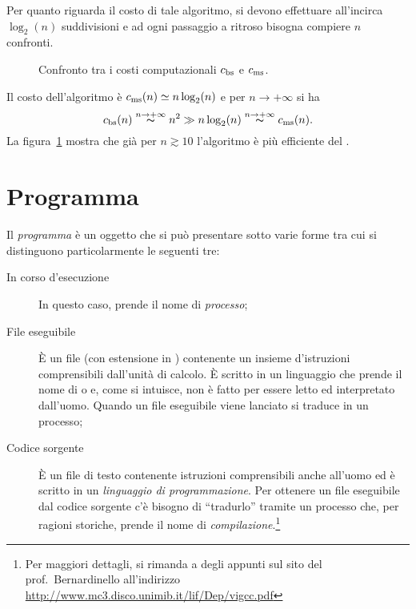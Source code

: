 Per quanto riguarda il costo di tale algoritmo, si devono effettuare all'incirca $\log_2(n)$ suddivisioni e ad ogni passaggio a ritroso bisogna compiere $n$ confronti.
\begin{figure}
	\centering

	\caption{Confronto tra i costi computazionali $c_\textup{bs}$ e $c_\textup{ms}$.}
	\label{fig:costo_cfr}
\end{figure}
Il costo dell'algoritmo è $c_\textup{ms}(n)\simeq n\log_{2}(n)$ e per $n\to+\infty$ si ha
\begin{equation}
c_\textup{bs}(n)\overset{n\to+\infty}{\thicksim} n^{2} \gg n\log_{2}(n) \overset{n\to+\infty}{\thicksim} c_\textup{ms}(n).
\end{equation}
La figura~\ref{fig:costo_cfr} mostra che già per $n \gtrsim \num{10}$ l'algoritmo  è più efficiente del .




	\section{Programma}

Il \emph{programma} è un oggetto che si può presentare sotto varie forme tra cui si distinguono particolarmente le seguenti tre:
\begin{description}
	\item[In corso d'esecuzione] In questo caso, prende il nome di \emph{processo};
	\item[File eseguibile] \`E un file (con estensione  in ) contenente un insieme d'istruzioni comprensibili dall'unità di calcolo.
\`E scritto in un linguaggio che prende il nome di  o  e, come si intuisce, non è fatto per essere letto ed interpretato dall'uomo.
Quando un file eseguibile viene lanciato si traduce in un processo;
	\item[Codice sorgente] \`E un file di testo contenente istruzioni comprensibili anche all'uomo ed è scritto in un \emph{linguaggio di programmazione}.
Per ottenere un file eseguibile dal codice sorgente c'è bisogno di ``tradurlo'' tramite un processo che, per ragioni storiche, prende il nome di \emph{compilazione}.\footnote{Per maggiori dettagli, si rimanda a degli appunti sul sito del prof.~Bernardinello all'indirizzo \url{http://www.mc3.disco.unimib.it/lif/Dep/vigcc.pdf}}
\end{description}
